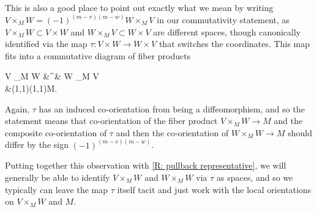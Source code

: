 \begin{remark}\label{R: precise commutativity}
	This is also a good place to point out exactly what we mean by writing $V \times_M W = (-1)^{(m-v)(m-w)}W \times_M V$ in our commutativity statement, as $V \times_M W \subset V \times W$ and $W \times_M V \subset W \times V$ are different spaces, though canonically identified via the map $\tau \colon V \times W \to W \times V$ that switches the coordinates.
	This map fits into a commutative diagram of fiber products
	\begin{diagram}[LaTeXeqno]
		V \times_M W &\rTo^\tau& W \times_M V\\
		&\rdTo(1,1)\ldTo(1,1)M.
	\end{diagram}
	Again, $\tau$ has an induced co-orientation from being a diffeomorphism, and so the statement means that co-orientation of the fiber product $V \times_M W \to M$ and the composite co-orientation of $\tau$ and then the co-orientation of $W \times_M W \to M$ should differ by the sign $(-1)^{(m-v)(m-w)}$.

	Putting together this observation with \cref{R: pullback representative}, we will generally be able to identify $V \times_M W$ and $W \times_M W$ via $\tau$ as spaces, and so we typically can leave the map $\tau$ itself tacit and just work with the local orientations on $V \times_M W$ and $M$.
\end{remark}


